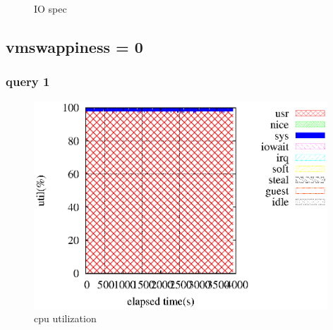 \documentclass[11pt,a4paper]{jsarticle}
\newlength{\subfigwidth}
\newlength{\subfigcolsep}
\begin{document}
\begin{figure}[thbp]
 \setlength{\subfigwidth}{.5\linewidth}
 \addtolength{\subfigwidth}{-.5\subfigcolsep}
 \begin{minipage}[b]{\subfigwidth}
 \end{minipage}
  \begin{minipage}[b]{\subfigwidth}
  \end{minipage}
  \caption{IO spec}
  \label{fig:3}
\end{figure}
\clearpage
\subsection*{vmswappiness = 0}
\subsubsection*{query 1}
\begin{figure}[thbp]
 \begin{center}
  \includegraphics[width=110mm]{vms01core1.eps}
 \end{center}
 \caption{cpu utilization}
 \label{fig:4cpu}
\end{figure}
\end{document}
